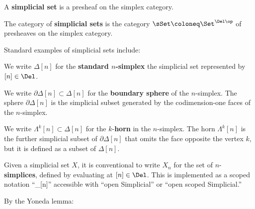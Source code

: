 \begin{defn}\label{defn:simplicial-set}
  \leanok
  A \textbf{simplicial set} is a presheaf on the simplex category.
\end{defn}

\begin{definition}\label{defn:sset-category}
\leanok
{}
The category of \textbf{simplicial sets} is the category $\sSet \coloneq \Set^{\Del\op}$ of pre\-sheaves on the simplex category.
\end{definition}

Standard examples of simplicial sets include:

\begin{definition}\label{defn:standard-simplex}
  \leanok
We write $\Delta[n]$ for the \textbf{standard $n$-simplex} the simplicial set represented by $[n] \in \Del$.
\end{definition}

\begin{definition}\label{defn:simplex-boundary}
  \leanok
  We write $\partial\Delta[n] \subset \Delta[n]$ for the \textbf{boundary sphere} of the $n$-simplex. The sphere $\partial\Delta[n]$ is the simplicial subset generated by the codimension-one faces of the $n$-simplex.
\end{definition}

\begin{definition}\label{defn:simplicial-horn}
  \leanok
  We write $\Lambda^k[n] \subset \Delta[n]$ for the $k$-\textbf{horn} in the $n$-simplex. The horn $\Lambda^k[n]$ is the further simplicial subset of $\partial\Delta[n]$ that omits the face opposite the vertex $k$, but it is defined as a subset of $\Delta[n]$.
\end{definition}

Given a simplicial set $X$, it is conventional to write $X_n$ for the set of $n$-\textbf{sim\-plices}, defined by evaluating at $[n] \in \Del$. This is implemented as a scoped notation ``\_[n]'' accessible with ``open Simplicial'' or ``open scoped Simplicial.''

By the Yoneda lemma:

